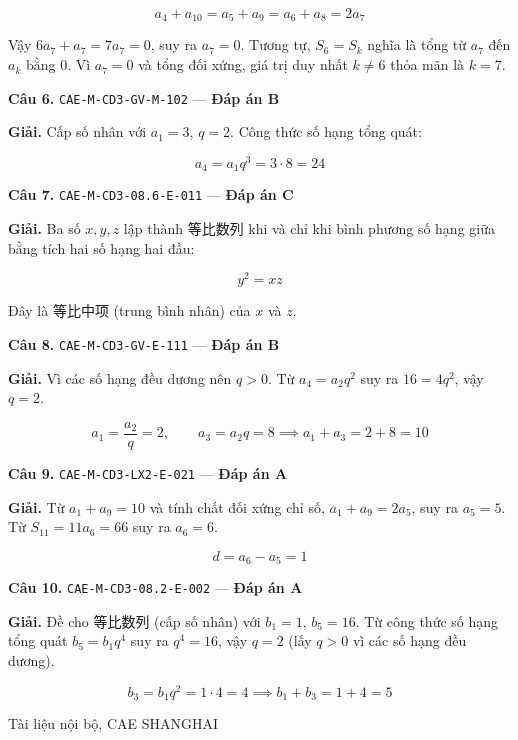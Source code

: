 \documentclass[11pt, a4paper]{article}
\begin{document}
$$a_4 + a_{10} = a_5 + a_9 = a_6 + a_8 = 2a_7$$

Vậy $6a_7 + a_7 = 7a_7 = 0$, suy ra $a_7 = 0$. Tương tự, $S_6 = S_k$ nghĩa là tổng từ $a_7$ đến $a_k$ bằng $0$. Vì $a_7 = 0$ và tổng đối xứng, giá trị duy nhất $k \ne 6$ thỏa mãn là $k = 7$.

\textbf{Câu 6.} \texttt{CAE-M-CD3-GV-M-102} — \textbf{Đáp án B}

\textbf{Giải.} Cấp số nhân với $a_1 = 3$, $q = 2$. Công thức số hạng tổng quát:

$$a_4 = a_1 q^3 = 3 \cdot 8 = 24$$

\textbf{Câu 7.} \texttt{CAE-M-CD3-08.6-E-011} — \textbf{Đáp án C}

\textbf{Giải.} Ba số $x, y, z$ lập thành 等比数列 khi và chỉ khi bình phương số hạng giữa bằng tích hai số hạng hai đầu:

$$y^2 = xz$$

Đây là 等比中项 (trung bình nhân) của $x$ và $z$.

\textbf{Câu 8.} \texttt{CAE-M-CD3-GV-E-111} — \textbf{Đáp án B}

\textbf{Giải.} Vì các số hạng đều dương nên $q > 0$. Từ $a_4 = a_2 q^2$ suy ra $16 = 4q^2$, vậy $q = 2$.

$$a_1 = \frac{a_2}{q} = 2, \qquad a_3 = a_2 q = 8 \implies a_1 + a_3 = 2 + 8 = 10$$

\textbf{Câu 9.} \texttt{CAE-M-CD3-LX2-E-021} — \textbf{Đáp án A}

\textbf{Giải.} Từ $a_1 + a_9 = 10$ và tính chất đối xứng chỉ số, $a_1 + a_9 = 2a_5$, suy ra $a_5 = 5$. Từ $S_{11} = 11a_6 = 66$ suy ra $a_6 = 6$.

$$d = a_6 - a_5 = 1$$

\textbf{Câu 10.} \texttt{CAE-M-CD3-08.2-E-002} — \textbf{Đáp án A}

\textbf{Giải.} Đề cho 等比数列 (cấp số nhân) với $b_1 = 1$, $b_5 = 16$. Từ công thức số hạng tổng quát $b_5 = b_1 q^4$ suy ra $q^4 = 16$, vậy $q = 2$ (lấy $q > 0$ vì các số hạng đều dương).

$$b_3 = b_1 q^2 = 1 \cdot 4 = 4 \implies b_1 + b_3 = 1 + 4 = 5$$
\vspace{0.8cm}
\begin{center}
{\footnotesize\color{cae_blue} Tài liệu nội bộ, CAE SHANGHAI}
\end{center}
\end{document}
